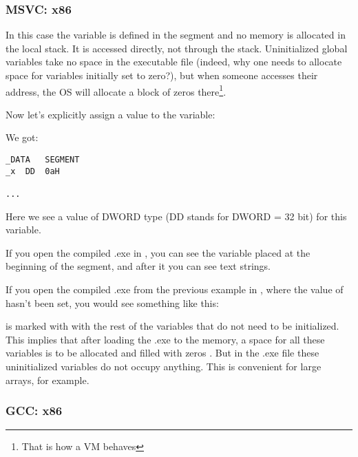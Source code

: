 \subsubsection{MSVC: x86}



In this case the  variable is defined in the  segment and no memory is allocated in the local stack. It is accessed directly, not through the stack. 
Uninitialized global variables take no space in the executable file
(indeed, why one needs to allocate space for variables initially set to zero?), 
but when someone accesses their address, 
the \ac{OS} will allocate a block of zeros there\footnote{That is how a \ac{VM} behaves}.

Now let's explicitly assign a value to the variable:



We got:

\begin{lstlisting}
_DATA	SEGMENT
_x	DD	0aH

...
\end{lstlisting}

Here we see a value  of DWORD type (DD stands for DWORD = 32 bit) for this variable.

If you open the compiled .exe in \IDA, you can see the  variable placed at the beginning of 
the  segment, and after it you can see text strings.

If you open the compiled .exe from the previous example in \IDA, where the value of  hasn't been set, you would see something like this:



 is marked with  with the rest of the variables that do not need to be initialized. 
This implies that after loading the .exe to the memory, a space for all these variables is to be 
allocated and filled with zeros .
But in the .exe file these uninitialized variables do not occupy anything.
This is convenient for large arrays, for example.



\subsubsection{GCC: x86}


